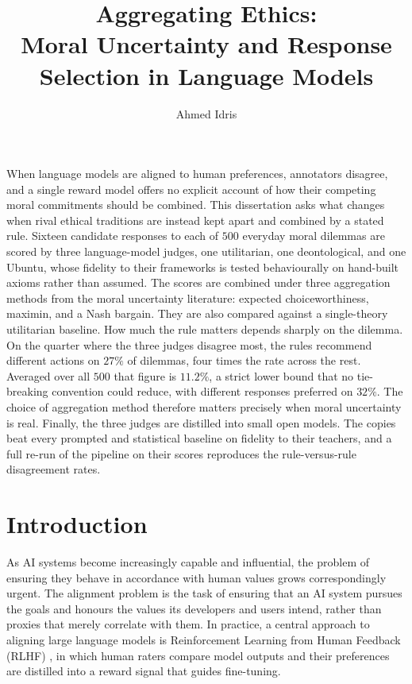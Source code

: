 \documentclass[10pt,twocolumn,a4paper]{article}
\title{\textbf{Aggregating Ethics:}\\ Moral Uncertainty and Response Selection in Language Models}
\author{Ahmed Idris}
\date{}
\let\cite\citep
\renewenvironment{abstract}{%
  \begin{center}\textbf{\large\abstractname}\end{center}%
  \vspace{2pt}%
}{\vspace{4pt}}
\begin{document}
\raggedbottom
\maketitle

\begin{abstract}
\noindent
When language models are aligned to human preferences, annotators
disagree, and a single reward model offers no explicit account of how
their competing moral commitments should be combined. This dissertation
asks what changes when rival ethical traditions are instead kept apart
and combined by a stated rule. Sixteen
candidate responses to each of $500$ everyday moral dilemmas are scored
by three language-model judges, one utilitarian, one deontological, and
one Ubuntu, whose fidelity to their frameworks is tested behaviourally
on hand-built axioms rather than assumed. The scores are combined under
three aggregation methods from the moral uncertainty literature:
expected choiceworthiness, maximin, and a Nash bargain. They are also compared
against a single-theory utilitarian baseline. How much the rule matters
depends sharply on the dilemma. On the quarter where the three judges
disagree most, the rules recommend different actions on $27\%$ of
dilemmas, four times the rate across the rest. Averaged over all $500$
that figure is $11.2\%$, a strict lower bound that no tie-breaking
convention could reduce, with different responses preferred on $32\%$.
The choice of aggregation method therefore matters precisely when moral
uncertainty is real. Finally, the three judges are distilled into small
open models. The copies beat every prompted and statistical baseline on
fidelity to their teachers, and a full re-run of the pipeline on their
scores reproduces the rule-versus-rule disagreement rates.
\end{abstract}

\section{Introduction}

As AI systems become increasingly capable and influential, the problem of
ensuring they behave in accordance with human values grows correspondingly
urgent. The alignment problem \cite{christian2020} is the task of ensuring
that an AI system pursues the goals and honours the values its developers
and users intend, rather than proxies that merely correlate with them. In
practice, a central approach to aligning large language models is
Reinforcement Learning from Human Feedback (RLHF)
\cite{ouyang2022,casper2023}, in
which human raters compare model outputs and their preferences are
distilled into a reward signal that guides fine-tuning.
\end{document}
